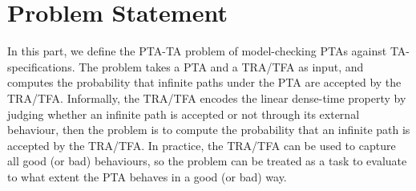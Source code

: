 \section{Problem Statement}
In this part, we define the {\sc PTA-TA} problem of model-checking {PTAs} against TA-specifications.
The problem takes a PTA and a TRA/TFA as input, and computes the probability that infinite paths under the PTA are accepted by the TRA/TFA.
Informally, the TRA/TFA encodes the linear dense-time property by judging whether an infinite path is accepted or not through its external behaviour,
then the problem is to compute the probability that an infinite path is accepted by the TRA/TFA.
In practice, the TRA/TFA can be used to capture all good (or bad) behaviours, so the problem can be treated as a task to evaluate to what extent the PTA behaves in a good (or bad) way.


